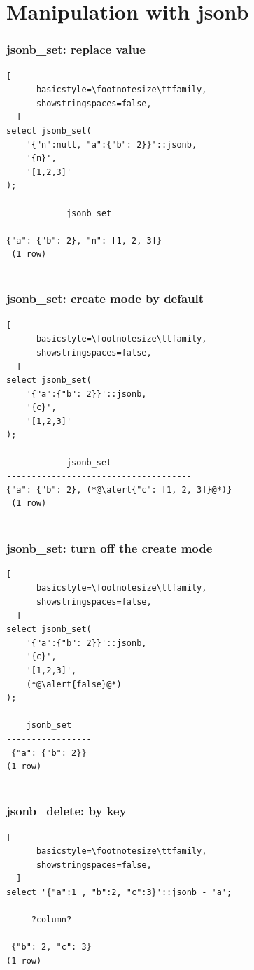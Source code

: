 \documentclass[14pt, compress]{beamer}
\begin{document}
\section{Manipulation with jsonb}

\begin{frame}[fragile]
  \frametitle{jsonb\_set: replace value}

  \begin{lstlisting}[
      basicstyle=\footnotesize\ttfamily,
      showstringspaces=false,
  ]
select jsonb_set(
    '{"n":null, "a":{"b": 2}}'::jsonb,
    '{n}',
    '[1,2,3]'
);

            jsonb_set                                 
-------------------------------------
{"a": {"b": 2}, "n": [1, 2, 3]}
 (1 row)
 
  \end{lstlisting}

\end{frame}

\begin{frame}[fragile]
  \frametitle{jsonb\_set: create mode by default}

  \begin{lstlisting}[
      basicstyle=\footnotesize\ttfamily,
      showstringspaces=false,
  ]
select jsonb_set(
    '{"a":{"b": 2}}'::jsonb,
    '{c}',
    '[1,2,3]'
);

            jsonb_set                                 
-------------------------------------
{"a": {"b": 2}, (*@\alert{"c": [1, 2, 3]}@*)}
 (1 row)
 
  \end{lstlisting}

\end{frame}

\begin{frame}[fragile]
  \frametitle{jsonb\_set: turn off the create mode}

  \begin{lstlisting}[
      basicstyle=\footnotesize\ttfamily,
      showstringspaces=false,
  ]
select jsonb_set(
    '{"a":{"b": 2}}'::jsonb,
    '{c}',
    '[1,2,3]',
    (*@\alert{false}@*)
);

    jsonb_set    
-----------------
 {"a": {"b": 2}}
(1 row)
 
  \end{lstlisting}

\end{frame}

\begin{frame}[fragile]
  \frametitle{jsonb\_delete: by key}

  \begin{lstlisting}[
      basicstyle=\footnotesize\ttfamily,
      showstringspaces=false,
  ]
select '{"a":1 , "b":2, "c":3}'::jsonb - 'a';

     ?column?     
------------------
 {"b": 2, "c": 3}
(1 row)

  \end{lstlisting}
\end{frame}
\end{document}
